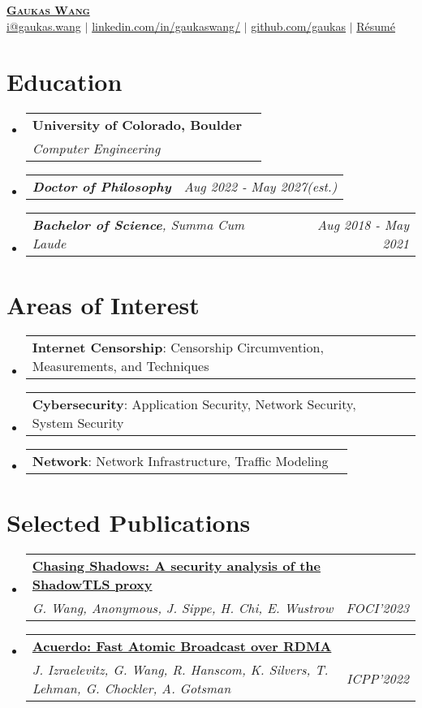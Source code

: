 \documentclass[letterpaper,11pt]{article}
\makeatletter
\newcommand{\resumeSubheading}[4]{
  \vspace{-2pt}\item
    \begin{tabular*}{0.97\textwidth}[t]{l@{\extracolsep{\fill}}r}
      \textbf{#1} & #2 \\
      \textit{\small#3} & \textit{\small #4} \\
    \end{tabular*}\vspace{-7pt}
}
\newcommand{\resumeSubSubheading}[2]{
    \item
    \begin{tabular*}{0.97\textwidth}{l@{\extracolsep{\fill}}r}
      \textit{\small#1} & \textit{\small #2} \\
    \end{tabular*}\vspace{-7pt}
}
\newcommand{\resumeProjectHeading}[2]{
    \item
    \begin{tabular*}{0.97\textwidth}{l@{\extracolsep{\fill}}r}
      \small#1 & #2 \\
    \end{tabular*}\vspace{-7pt}
}
\newcommand{\resumeSubHeadingListStart}{\begin{itemize}[leftmargin=0.15in, label={}]}
\newcommand{\resumeSubHeadingListEnd}{\end{itemize}}
\makeatother
\begin{document}
\begin{center}
  \href{https://gaukas.wang}{\textbf{\Huge \scshape Gaukas Wang}} \\ \vspace{1pt}
    \href{mailto:i@gaukas.wang}{{i@gaukas.wang}} $|$ 
    \href{https://www.linkedin.com/in/gaukaswang/}{linkedin.com/in/gaukaswang/} $|$
    \href{https://github.com/gaukas}{{github.com/gaukas}} $|$ 
    \href{https://gauk.as/resume}{{Résumé}}
    
\end{center}


\section{Education}
\resumeSubHeadingListStart
\resumeSubheading
{University of Colorado, Boulder}{}
{Computer Engineering}{}
\resumeSubSubheading
{\textbf{Doctor of Philosophy}}{Aug 2022 - May 2027\textit{(est.)}}
\resumeSubSubheading
{\textbf{Bachelor of Science}, {Summa Cum Laude}}{Aug 2018 - May 2021}
\resumeSubHeadingListEnd

\vspace{1pt}

\section{Areas of Interest}
\resumeSubHeadingListStart

\resumeProjectHeading
{\textbf{Internet Censorship}: Censorship Circumvention, Measurements, and Techniques}{}

\resumeProjectHeading
{\textbf{Cybersecurity}: Application Security, Network Security, System Security}{}

\resumeProjectHeading
{\textbf{Network}: Network Infrastructure, Traffic Modeling}{}

\resumeSubHeadingListEnd
\vspace{1pt}

\section{Selected Publications}
\resumeSubHeadingListStart
  \resumeSubheading
  {\href{https://gaukas.wang/paper/chasing_shadows-foci23.pdf}{\textbf{Chasing Shadows: A security analysis of the ShadowTLS proxy}}}{}
  {\emph{G. Wang, Anonymous, J. Sippe, H. Chi, E. Wustrow} }{FOCI'2023}
  \resumeSubheading
  {\href{https://gaukas.wang/paper/acuerdo-icpp22.pdf}{\textbf{Acuerdo: Fast Atomic Broadcast over RDMA}}}{}
  {\emph{J. Izraelevitz, G. Wang, R. Hanscom, K. Silvers, T. Lehman, G. Chockler, A. Gotsman} }{ICPP'2022}
\resumeSubHeadingListEnd
\vspace{1pt}
\end{document}
